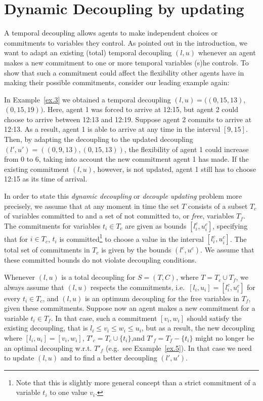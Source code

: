 \section{Dynamic Decoupling by updating} \label{section:adapt}
A temporal decoupling allows agents to make independent choices or commitments to variables they control.
As pointed out in the introduction, we want to adapt an existing (total) temporal decoupling $(l, u)$ whenever an agent makes a new commitment to one or more temporal variables (s)he controls. To show that such a commitment could affect the flexibility other agents have in making their possible commitments, consider our leading example again:
\begin{example} \label{ex.5}
In Example~\ref{ex.3}  we obtained a temporal decoupling $(l,u) = ( (0, 15 ,13)$, $(0, 15, 19))$.  Here, agent 1 was forced to arrive at 12:15, but agent
2 could choose to arrive between 12:13 and 12:19. Suppose agent 2 commits to arrive at 12:13. As a result, agent 1 is able to arrive at any time in the interval $[9,15]$. Then, by adapting the decoupling to the updated decoupling $(l',u') = ( (0, 9 ,13), (0, 15, 13))$, the flexibility of agent 1 could increase from 0 to 6, taking into account the new commitment agent 1 has made. 
If the existing commitment $(l, u)$, however, is not updated, agent 1 still has to choose 12:15 as its time of arrival.
\blbox
\end{example}
In order to state this \emph{dynamic decoupling} or \emph{decouple updating} problem more precisely, we assume that at any moment in time the set $T$ consists of a subset $T_c$ of variables committed to and a set of not committed to, or \emph{free}, variables $T_f$.  The commitments for variables $t_i \in T_c$ are given as bounds $[l^c_i, u^c_i]$, specifying that for $i \in T_c$, $t_i$ is committed\footnote{Note that this is slightly more general concept than a strict commitment of a variable $t_i$ to one value $v_i$.} to choose a value in the interval
$[l^c_i,u^c_i]$. The total set of commitments in $T_c$ is given by the bounds $(l^c, u^c)$. We assume that these committed bounds do not violate
decoupling conditions.

Whenever $(l,u)$ is a total decoupling for $S = (T, C)$, where $T = T_c \cup T_f$, we always assume that $(l,u)$ respects the commitments, i.e.\ $[l_i, u_i] = [l^c_i, u^c_i]$ for every $t_i \in T_c$,
and $(l, u)$ is an optimum decoupling for the free variables in $T_f$, given these commitments.
Suppose now an agent makes a new commitment for a variable $t_i \in  T_f$. 
In that case, such a commitment $[v_i, w_i]$ should satisfy the existing decoupling, that is $l_i \leq v_i \leq w_i \leq u_i$, but as a result, the new decoupling where $[l_i, u_i] = [v_i, w_i]$, $T'_c = T_c \cup \{t_i\}$,and $T'_f = T_f - \{t_i\}$ might no longer be an optimal decoupling w.r.t. $T'_f$ (e.g.\ see Example~\ref{ex.5}). In that case we need to update $(l, u)$ and to find a better decoupling $(l',u')$.


